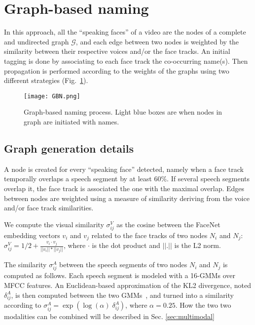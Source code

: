 \section{Graph-based naming}
\label{sec:graph}

In this approach, all the ``speaking faces'' of a video are the nodes of a complete and undirected graph $\mathcal{G}$, and each edge between two nodes is weighted by the similarity between their respective voices and/or the face tracks.
An initial tagging is done by associating to each face track the co-occurring name(s). Then propagation is performed according to the weights of the graphs using two different strategies (Fig.~\ref{fig:gbn}).

\begin{figure}[!htb]
 \centering
 \texttt{[image: GBN.png]}
\vspace*{-5mm}
 \caption{Graph-based naming process. Light blue boxes are when nodes in graph are initiated with names.}
\vspace*{-5mm}
 \label{fig:gbn}
\end{figure}

\subsection{Graph generation details}
\label{ssec:graph_gen}
A node is created for every ``speaking face'' detected, namely when a face track temporally overlaps a speech segment by at least 60\%. If several speech segments overlap it, the face track is associated the one with the maximal overlap.
%
Edges between nodes are weighted using a measure of similarity deriving from the voice and/or face track similarities.

We compute the visual similarity $\sigma^V_{ij}$ as the cosine between the FaceNet embedding vectors $v_i$ and $v_j$ related to the face tracks of two nodes $N_i$ and $N_j$: $\sigma^V_{ij}=1/2+\frac{v_i\cdot v_j}{||v_i||*||v_j||}$, where $\cdot$ is the dot product and $||.||$ is the L2 norm.

The similarity $\sigma^A_{ij}$ between the speech segments of two nodes  $N_i$ and $N_j$ is computed as follows. Each speech segment is modeled with a 16-GMMs over MFCC features. An Euclidean-based approximation of the KL2 divergence, noted $\delta^A_{ij}$, is then computed between the two GMMs~\cite{Ben}, and turned into a similarity according to $\sigma^A_{ij}=\exp(\log{(\alpha)} \; \delta^A_{ij})$, where $\alpha = 0.25$.
%
How the two two modalities can be combined will be described in Sec. \ref{sec:multimodal}

